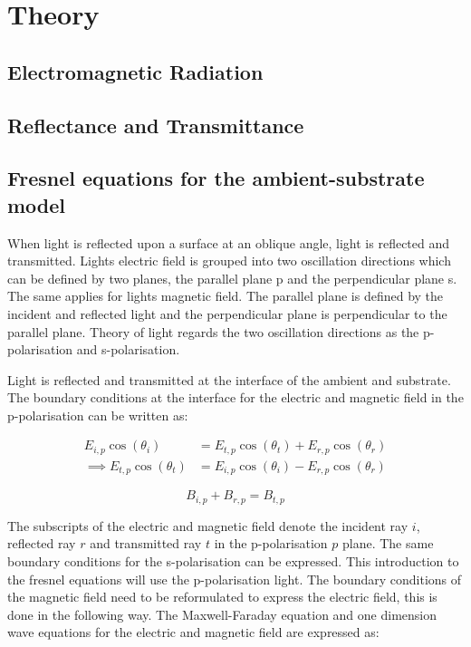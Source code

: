 \documentclass[MasterThesisMain.tex]{subfiles}
\begin{document}
\chapter{Theory}

\section{Electromagnetic Radiation}

\section{Reflectance and Transmittance}
	
\section{Fresnel equations for the ambient-substrate model}
When light is reflected upon a surface at an oblique angle, light is reflected and transmitted. Lights electric field is grouped into two oscillation directions which can be defined by two planes, the parallel plane p and the perpendicular plane s. The same applies for lights magnetic field. The parallel plane is defined by the incident and reflected light and the perpendicular plane is perpendicular to the parallel plane. Theory of light regards the two oscillation directions as the p-polarisation and s-polarisation.

Light is reflected and transmitted at the interface of the ambient and substrate. The boundary conditions at the interface for the electric and magnetic field in the p-polarisation can be written as:

\begin{align} \label{elbound}
E_{i,p}\cos{(\theta_i)} &= E_{t,p}\cos{(\theta_t)} + E_{r,p}\cos{(\theta_r)}\\
\implies E_{t,p}\cos{(\theta_t)} &= E_{i,p}\cos{(\theta_i)} - E_{r,p}\cos{(\theta_r)}
\end{align} 

\begin{equation} \label{magnbound}
B_{i,p} + B_{r,p} = B_{t,p}
\end{equation}

The subscripts of the electric and magnetic field denote the incident ray $i$, reflected ray $r$ and transmitted ray $t$ in the p-polarisation $p$ plane. The same boundary conditions for the s-polarisation can be expressed. This introduction to the fresnel equations will use the p-polarisation light. The boundary conditions of the magnetic field need to be reformulated to express the electric field, this is done in the following way. The Maxwell-Faraday equation and one dimension wave equations for the electric and magnetic field are expressed as:
\end{document}

